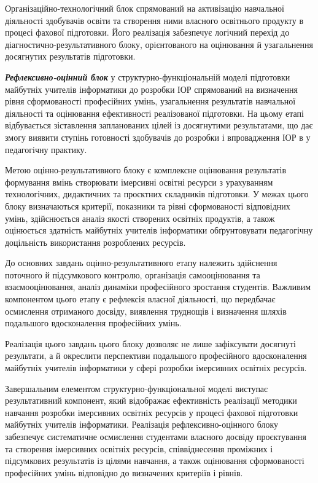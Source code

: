 Організаційно-технологічний блок спрямований на активізацію навчальної діяльності здобувачів освіти та створення ними власного освітнього продукту в процесі фахової підготовки. Його реалізація забезпечує логічний перехід до діагностично-результативного блоку, орієнтованого на оцінювання й узагальнення досягнутих результатів підготовки.

\emph{\textbf{Рефлексивно-оцінний блок}} у структурно-функціональній моделі підготовки майбутніх учителів інформатики до розробки ІОР спрямований на визначення рівня сформованості професійних умінь, узагальнення результатів навчальної діяльності та оцінювання ефективності реалізованої підготовки. На цьому етапі відбувається зіставлення запланованих цілей із досягнутими результатами, що дає змогу виявити ступінь готовності здобувачів до розробки і впровадження ІОР в у педагогічну практику.

Метою оцінно-результативного блоку є комплексне оцінювання результатів формування вмінь створювати імерсивні освітні ресурси з урахуванням технологічних, дидактичних та проєктних складників підготовки. У межах цього блоку визначаються критерії, показники та рівні сформованості відповідних умінь, здійснюється аналіз якості створених освітніх продуктів, а також оцінюється здатність майбутніх учителів інформатики обґрунтовувати педагогічну доцільність використання розроблених ресурсів.

До основних завдань оцінно-результативного етапу належить здійснення поточного й підсумкового контролю, організація самооцінювання та взаємооцінювання, аналіз динаміки професійного зростання студентів. Важливим компонентом цього етапу є рефлексія власної діяльності, що передбачає осмислення отриманого досвіду, виявлення труднощів і визначення шляхів подальшого вдосконалення професійних умінь.

Реалізація цього завдань цього блоку дозволяє не лише зафіксувати досягнуті результати, а й окреслити перспективи подальшого професійного вдосконалення майбутніх учителів інформатики у сфері розробки імерсивних освітніх ресурсів.

Завершальним елементом структурно-функціональної моделі виступає результативний компонент, який відображає ефективність реалізації методики навчання розробки імерсивних освітніх ресурсів у процесі фахової підготовки майбутніх учителів інформатики. Реалізація рефлексивно-оцінного блоку забезпечує систематичне осмислення студентами власного досвіду проєктування та створення імерсивних освітніх ресурсів, співвіднесення проміжних і підсумкових результатів із цілями навчання, а також оцінювання сформованості професійних умінь відповідно до визначених критеріїв і рівнів.

